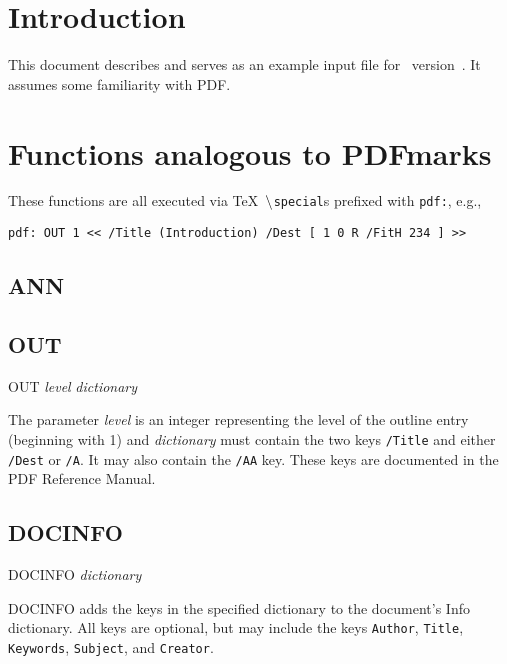\section{Introduction}
This document describes and serves as an example input file for \dvipdf~version~\version.
It assumes some familiarity with PDF.

\section{Functions analogous to PDFmarks}
These functions are all executed via \TeX\ $\tt \backslash${\tt special}s
prefixed with {\tt pdf:}, e.g.,

{\tt pdf: OUT 1 << /Title (Introduction) /Dest [ 1 0 R /FitH 234 ] >> }

\subsection{ANN}
\subsection{OUT}
OUT {\it level} {\it dictionary}

The parameter {\it level} is an integer representing the level of the outline
entry (beginning with 1) and {\it dictionary} must contain
the two keys {\tt /Title} and either {\tt /Dest} or {\tt /A}.
It may also contain the {\tt /AA} key.  These keys are documented
in the PDF Reference Manual.



\subsection{DOCINFO}

DOCINFO {\it dictionary}

DOCINFO adds the keys in the specified dictionary to the
document's Info dictionary.  All keys are optional, but may include
the keys {\tt Author}, {\tt Title}, {\tt Keywords}, {\tt Subject},
and {\tt Creator}.


